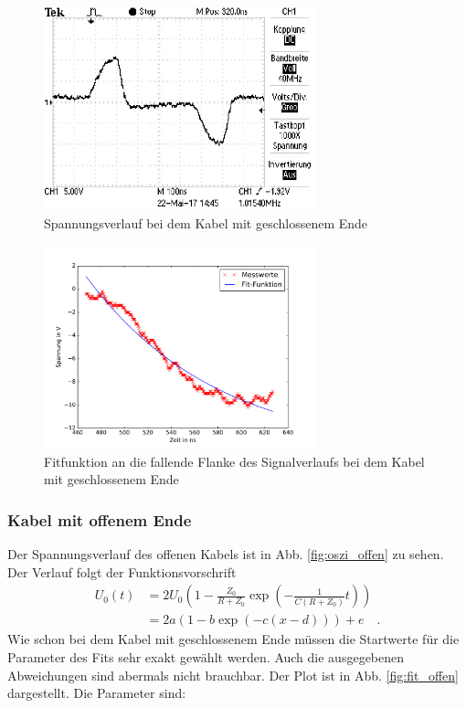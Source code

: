 \begin{figure}
	\centering
	\includegraphics[width=0.7\textwidth]{Laplace/geschlossen.pdf}
\caption{Spannungsverlauf bei dem Kabel mit geschlossenem Ende}
\label{fig:oszi_geschlossen}
\end{figure}

\begin{figure}
	\centering
	\includegraphics[width=0.7\textwidth]{Laplace/geschlossenes_ende.pdf}
	\caption{Fitfunktion an die fallende Flanke des Signalverlaufs bei dem Kabel mit geschlossenem Ende}
\label{fig:fit_geschlossen}
\end{figure}

\clearpage
\subsubsection{Kabel mit offenem Ende}
Der Spannungsverlauf des offenen Kabels ist in  Abb. \ref{fig:oszi_offen} zu sehen. Der Verlauf folgt der Funktionsvorschrift
\begin{align}
	U_0(t) &= 2U_0\left(1 -  \frac{Z_0}{R+Z_0} \exp \left( - \frac{1}{C(R+Z_0)} t\right) \right)\\
	&=  2 a (1 - b \exp(-c (x-d))) + e \quad .
\end{align}
Wie schon bei dem Kabel mit geschlossenem Ende müssen die Startwerte für die Parameter des Fits sehr exakt gewählt werden. Auch die ausgegebenen Abweichungen sind abermals nicht brauchbar. Der Plot ist in Abb. \ref{fig:fit_offen} dargestellt. Die Parameter sind:


